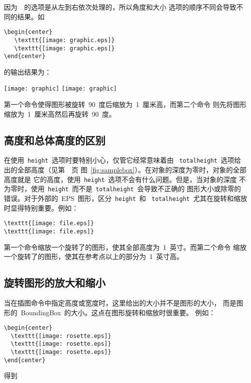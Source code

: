 因为~~的选项是从左到右依次处理的，所以角度和大小
选项的顺序不同会导致不同的结果。如
\begin{Verbatim}[xleftmargin=1cm]
\begin{center}
   \texttt{[image: graphic.eps]}
   \texttt{[image: graphic.eps]}
\end{center}
\end{Verbatim}
的输出结果为：
\begin{center}
   \texttt{[image: graphic]}
   \texttt{[image: graphic]}
\end{center}
第一个命令使得图形被旋转~90~度后缩放为~1~厘米高，而第二个命令
则先将图形缩放为~1~厘米高然后再旋转~90~度。

\subsection{高度和总体高度的区别}\label{ssec:diffheight}

在使用~\texttt{height}~选项时要特别小心，仅管它经常意味着由
~\texttt{totalheight}~选项给出的全部高度（见第~\pageref{fig:samplebox}~页
图~\ref{fig:samplebox}）。在对象的深度为零时，对象的全部高度就是
它的高度，使用~\texttt{height}~选项不会有什么问题。但是，当对象的深度
不为零时，使用~\texttt{height}~而不是~\texttt{totalheight}~会导致不正确的
图形大小或除零的错误。对于外部的~EPS~图形，区分~\texttt{height}~和
~\texttt{totalheight}~尤其在旋转和缩放时显得特别重要。例如：
\begin{Verbatim}[xleftmargin=1cm]
\texttt{[image: file.eps]}
\texttt{[image: file.eps]}
\end{Verbatim}
第一个命令缩放一个旋转了的图形，使其全部高度为~1~英寸。而第二个命令
缩放一个旋转了的图形，使其在参考点以上的部分为~1~英寸高。

\subsection{旋转图形的放大和缩小}\label{ssec:enlarge}

当在插图命令中指定高度或宽度时，这里给出的大小并不是图形的大小，
而是图形的~BoundingBox~的大小。这点在图形旋转和缩放时很重要。
例如：

\begin{Verbatim}[xleftmargin=1cm]
\begin{center}
  \texttt{[image: rosette.eps]}
  \texttt{[image: rosette.eps]}
  \texttt{[image: rosette.eps]}
\end{center}
\end{Verbatim}
得到

